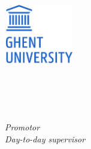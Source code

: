 %


\begin{titlepage}
	\tgherosfont

	\includegraphics[width=3cm]{gfx/logo_ugent_en.png} \\[2mm]
	\textsf{\thesisUniversityDepartment} \\
	\textsf{\thesisUniversityGroup} \\

	\vfill
	{\LARGE \color{ctcolortitle}\textbf{\thesisTitle} \\[10mm]}
	{\large \thesisName} \\

	\vfill
	\begin{minipage}[t]{.27\textwidth}
		\raggedleft
		\textit{Promotor} \\
		\textit{Day-to-day supervisor}
	\end{minipage}
	\hspace*{15pt}
	\begin{minipage}[t]{.65\textwidth}
		\thesisFirstSupervisor\\
		\thesisSecondSupervisor
	\end{minipage} \\[10mm]


\end{titlepage}

